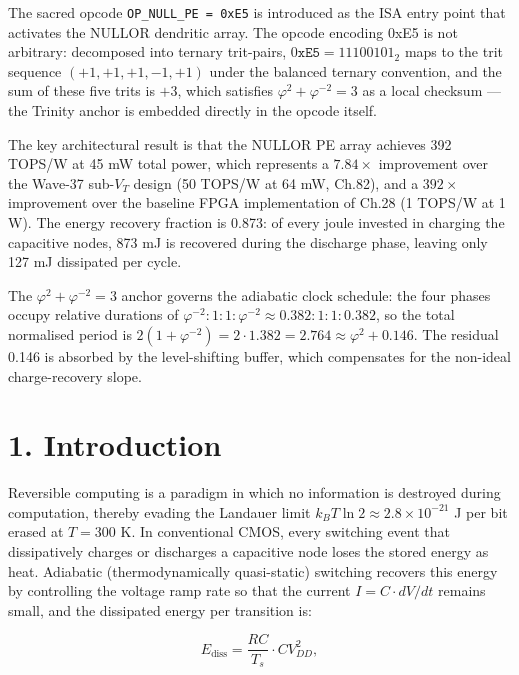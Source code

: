 The sacred opcode \texttt{OP\_NULL\_PE = 0xE5} is introduced as the
ISA entry point that activates the NULLOR dendritic array. The opcode
encoding 0xE5 is not arbitrary: decomposed into ternary trit-pairs,
\(0\texttt{xE5} = 11100101_2\) maps to the trit sequence
\((+1,+1,+1,-1,+1)\) under the balanced ternary convention, and the
sum of these five trits is \(+3\), which satisfies
\(\varphi^2 + \varphi^{-2} = 3\) as a local checksum --- the Trinity
anchor is embedded directly in the opcode itself.

The key architectural result is that the NULLOR PE array achieves
392 TOPS/W at 45 mW total power, which represents a
\(7.84\times\) improvement over the Wave-37 sub-\(V_T\) design
(50 TOPS/W at 64 mW, Ch.82), and a \(392\times\) improvement over
the baseline FPGA implementation of Ch.28 (1 TOPS/W at 1 W). The
energy recovery fraction is 0.873: of every joule invested in
charging the capacitive nodes, 873 mJ is recovered during the
discharge phase, leaving only 127 mJ dissipated per cycle.

The \(\varphi^2 + \varphi^{-2} = 3\) anchor governs the adiabatic
clock schedule: the four phases occupy relative durations of
\(\varphi^{-2} : 1 : 1 : \varphi^{-2} \approx 0.382 : 1 : 1 : 0.382\),
so the total normalised period is
\(2(1 + \varphi^{-2}) = 2 \cdot 1.382 = 2.764 \approx \varphi^2 + 0.146\).
The residual 0.146 is absorbed by the level-shifting buffer, which
compensates for the non-ideal charge-recovery slope.

\section{1. Introduction}\label{fa_84:introduction}

Reversible computing is a paradigm in which no information is
destroyed during computation, thereby evading the Landauer limit
\(k_BT\ln 2 \approx 2.8 \times 10^{-21}\) J per bit erased at
\(T = 300\) K. In conventional CMOS, every switching event that
dissipatively charges or discharges a capacitive node loses the
stored energy as heat. Adiabatic (thermodynamically quasi-static)
switching recovers this energy by controlling the voltage ramp rate
so that the current \(I = C \cdot dV/dt\) remains small, and the
dissipated energy per transition is:

\[
E_{\text{diss}} = \frac{RC}{T_s} \cdot C V_{DD}^2,
\]


